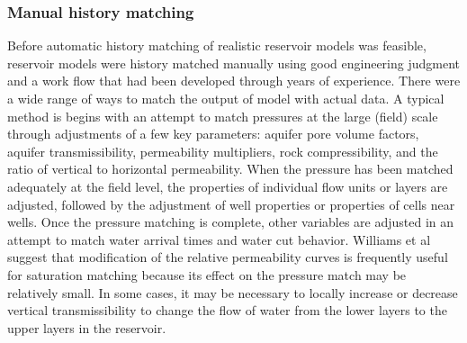 \documentclass[12pt,a4paper]{report}
\begin{document}
\subsubsection{Manual history matching \cite{His4}}
Before automatic history matching of realistic reservoir models was feasible, reservoir models were history matched manually using good engineering judgment and a work flow that had been developed through years of experience. There were a wide range of ways to match the output of model with actual data. A typical method is begins with an attempt to match pressures at the large (field) scale through adjustments of a few key parameters: aquifer pore volume factors, aquifer transmissibility, permeability multipliers, rock compressibility, and the ratio of vertical to horizontal permeability. When the pressure has been matched adequately at the field level, the properties of individual flow units or layers are adjusted, followed by the adjustment of well properties or properties of cells near wells.
Once the pressure matching is complete, other variables are adjusted in an attempt to match water arrival times and water cut behavior. Williams et al\cite{His3} suggest that modification of the relative permeability curves is frequently useful for saturation matching because its effect on the pressure match may be relatively small. In some cases, it may be necessary to locally increase or decrease vertical transmissibility to change the flow of water from the lower layers to the upper layers in the reservoir.
\end{document}
